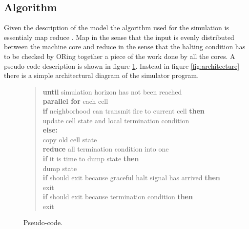 \documentclass[Lau]{sapthesis} %
\begin{document}
\subsection{Algorithm}

Given the description of the model the algorithm used for the simulation is
essentialy map reduce \cite{sac}. Map in the sense that the input is
evenly distributed between the machine core and reduce in the sense that the
halting condition has to be checked by ORing together a piece of the work done
by all the cores. A pseudo-code description is shown in figure \ref{fig:code}.
Instead in figure \ref{fig:architecture} there is a simple architectural diagram
of the simulator program.

\begin{figure}
\centering
\begin{verse}
\textbf{until} simulation horizon has not been reached\\
\hspace{2em} \textbf{parallel for} each cell\\
\hspace{2em}\hspace{2em} \textbf{if} neighborhood can transmit fire to current cell \textbf{then}\\
\hspace{2em}\hspace{2em}\hspace{2em} update cell state and local termination condition\\
\hspace{2em}\hspace{2em} \textbf{else:}\\
\hspace{2em}\hspace{2em}\hspace{2em} copy old cell state\\
\hspace{2em} \textbf{reduce} all termination condition into one\\
\hspace{2em} \textbf{if} it is time to dump state \textbf{then}\\
\hspace{2em}\hspace{2em} dump state\\
\hspace{2em} \textbf{if} should exit because graceful halt signal has arrived \textbf{then}\\
\hspace{2em}\hspace{2em} exit\\
\hspace{2em} \textbf{if} should exit because termination condition \textbf{then}\\
\hspace{2em}\hspace{2em} exit
\end{verse}
\caption{Pseudo-code.}
\label{fig:code}
\end{figure}
\end{document}
